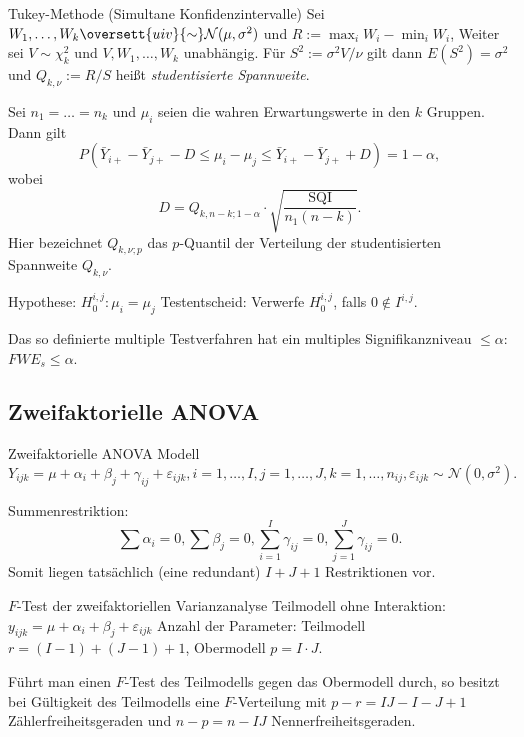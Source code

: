 \begin{karte}{Tukey-Methode (Simultane Konfidenzintervalle)}
Sei \(W_1, \ldots, W_k \oversett{uiv}{\sim} \mathcal{N}(\mu, \sigma^2)\) und \(R := \max_i W_i - \min_i W_i\),
Weiter sei \(V\sim \chi_k^2\) und \(V, W_1, \ldots, W_k\) unabhängig. Für \(S^2 := \sigma^2 V/\nu\) 
gilt dann \(E(S^2) = \sigma^2\) und \(Q_{k,\nu} := R/S\) heißt \textit{studentisierte Spannweite}.

Sei \(n_1 = \ldots = n_k\) und \(\mu_i\) seien die wahren Erwartungswerte in den \(k\) Gruppen. Dann gilt 
\[ P(\bar{Y}_{i+} - \bar{Y}_{j+} - D \leq \mu_i - \mu_j \leq \bar{Y}_{i+} - \bar{Y}_{j+} + D) = 1-\alpha, \]
wobei 
\[ D = Q_{k,n-k;1-\alpha} \cdot \sqrt{\frac{\mathrm{SQI}}{n_1(n-k)}}. \]
Hier bezeichnet \(Q_{k,\nu;p}\) das \(p\)-Quantil der Verteilung der studentisierten Spannweite \(Q_{k,\nu}\).

Hypothese: \(H_0^{i,j}: \mu_i = \mu_j\)
Testentscheid: Verwerfe \(H_0^{i,j}\), falls \(0 \not\in I^{i,j}\).

Das so definierte multiple Testverfahren hat ein multiples Signifikanzniveau \(\leq \alpha\): \(FWE_s \leq \alpha\).
\end{karte}

\subsection{Zweifaktorielle ANOVA}

\begin{karte}{Zweifaktorielle ANOVA Modell}
\[ Y_{ijk} = \mu + \alpha_i + \beta_j + \gamma_{ij} + \varepsilon_{ijk}, i=1,\ldots, I, j=1,\ldots, J, k = 1, \ldots, n_{ij}, \varepsilon_{ijk} \sim \mathcal{N}(0, \sigma^2). \]

Summenrestriktion: 
\[ \sum \alpha_i = 0, \sum \beta_j = 0, \sum_{i=1}^I \gamma_{ij} = 0, \sum_{j=1}^J \gamma_{ij} = 0. \]
Somit liegen tatsächlich (eine redundant) \(I + J + 1\) Restriktionen vor. 
\end{karte}

\begin{karte}{\(F\)-Test der zweifaktoriellen Varianzanalyse}
Teilmodell ohne Interaktion: 
\(y_{ijk}=\mu + \alpha_i + \beta_j + \varepsilon_{ijk}\)
Anzahl der Parameter: Teilmodell \(r = (I-1) + (J-1) + 1\), Obermodell \(p=I \cdot J\).

Führt man einen \(F\)-Test des Teilmodells gegen das Obermodell durch, so besitzt bei Gültigkeit des 
Teilmodells eine \(F\)-Verteilung mit \(p-r = IJ - I -J + 1\) Zählerfreiheitsgeraden und \(n-p = n - IJ\) 
Nennerfreiheitsgeraden. 
\end{karte}

